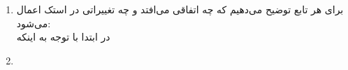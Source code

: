 \begin{enumerate}
	\item 
	برای هر تابع توضیح می‌دهیم که چه اتفاقی می‌افتد و چه تغییراتی در استک اعمال می‌شود:\\
	در ابتدا با توجه به اینکه
	\item
	 
\end{enumerate}